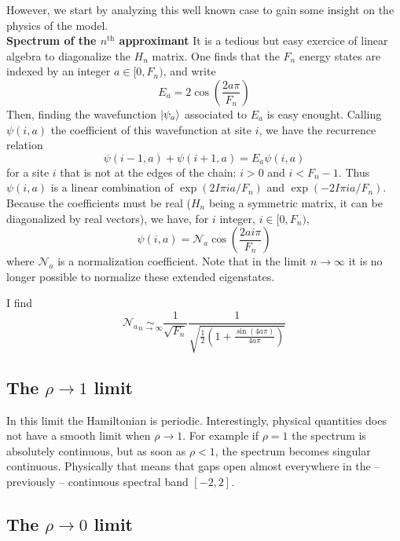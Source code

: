 \documentclass[11pt]{article}
\newcommand{\simlim}[2]{\ensuremath{ \underset{#1 \rightarrow #2}{\sim} }}
\newcommand{\nth}{$n^\text{th}$}
\begin{document}
However, we start by analyzing this well known case to gain some insight on the physics of the model.
\\

\textbf{Spectrum of the \nth{} approximant}
It is a tedious but easy exercice of linear algebra to diagonalize the $H_n$ matrix.
One finds that the $F_n$ energy states are indexed by an integer $a \in [0, F_n)$, and write
\begin{equation}
	E_a = 2 \cos \left( \frac{2 a \pi}{F_n} \right)
\end{equation}
Then, finding the wavefunction $\ket{\psi_a}$ associated to $E_a$ is easy enought. Calling $\psi(i,a)$ the coefficient of this wavefunction at site $i$, we have the recurrence relation
\begin{equation}
	\psi(i-1,a) + \psi(i+1,a) = E_a \psi(i,a)
\end{equation}
for a site $i$ that is not at the edges of the chain: $i > 0$ and $i < F_n -1$.
Thus $\psi(i,a)$ is a linear combination of $\exp( 2 I \pi i a/F_n )$ and $\exp( -2 I \pi i a/F_n )$. 
Because the coefficients must be real ($H_n$ being a symmetric matrix, it can be diagonalized by real vectors), we have, for $i$ integer, $i \in [0, F_n)$,
\begin{equation}
	\psi(i,a) = \mathcal{N}_a \cos \left( \frac{2 a i \pi}{F_n} \right)
\end{equation}
where $\mathcal{N}_a$ is a normalization coefficient. Note that in the limit $n \rightarrow \infty$ it is no longer possible to normalize these extended eigenstates.

I find
\begin{equation}
	\mathcal{N}_a \simlim{n}{\infty} \frac{1}{\sqrt{F_n}} \frac{1}{\sqrt{\frac{1}{2}\left( 1 + \frac{\sin(4 a \pi)}{4 a \pi} \right)}}
\end{equation}
\subsection{The $\rho \rightarrow 1$ limit}

In this limit the Hamiltonian is periodic. Interestingly, physical quantities does not have a smooth limit when $\rho \rightarrow 1$. 
For example if $\rho = 1$ the spectrum is absolutely continuous, but as soon as $\rho < 1$, the spectrum becomes singular continuous. Physically that means that gaps open almost everywhere in the -- previously -- continuous spectral band $[-2,2]$.

\subsection{The $\rho \rightarrow 0$ limit}
\end{document}
